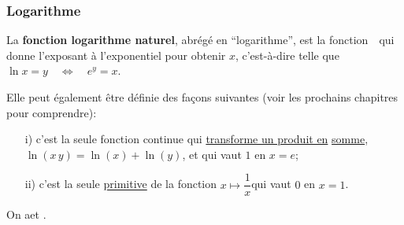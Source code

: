 \begin{frame}[plain]
\frametitle{\bf Logarithme}
\medskip 

\begin{itemize}
\bitem
La {\bf fonction logarithme naturel}, abr\'eg\'e en ``logarithme'', 
est la fonction\ \ qui donne l'exposant \`a 
l'exponentiel pour obtenir $x$, c'est-\`a-dire telle que\quad 
$\ln x = y \quad\Leftrightarrow\quad e^y=x$. 
\vspace*{3mm}

\pause
Elle peut \'egalement \^etre d\'efinie des fa\c{c}ons suivantes 
(voir les prochains chapitres pour comprendre): 
\vspace*{2mm}

\begin{itemize}
\item[i)]
c'est la seule fonction continue qui \underline{transforme un produit en} 
\underline{somme}, $\ln(x\,y)=\ln(x)+ \ln(y)$, et qui vaut $1$ en $x=e$;
\vspace*{2mm}

\item[ii)]
c'est la seule \underline{primitive} de la fonction\quad 
$x\mapsto \dfrac{1}{x}$\quad qui vaut $0$ en $x=1$. 
\end{itemize}
\vspace*{2mm}

On a\quad \framebox{\ $D_{\ln}=]0,\infty[$\ }\quad et\quad 
{}. 
\end{itemize}

\end{frame}


